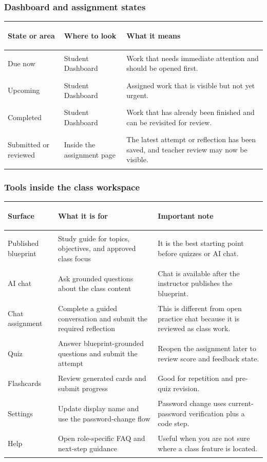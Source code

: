 \documentclass[11pt,a4paper]{article}
\begin{document}
\subsubsection*{Dashboard and assignment states}

\begin{table}[H]
\centering
\small
\begin{tabularx}{\textwidth}{>{\bfseries\raggedright\arraybackslash}p{2.8cm}>{\raggedright\arraybackslash}p{3.9cm}X}
\toprule
State or area & Where to look & What it means \\
\midrule
Due now & Student Dashboard & Work that needs immediate attention and should be opened first. \\
Upcoming & Student Dashboard & Assigned work that is visible but not yet urgent. \\
Completed & Student Dashboard & Work that has already been finished and can be revisited for review. \\
Submitted or reviewed & Inside the assignment page & The latest attempt or reflection has been saved, and teacher review may now be visible. \\
\bottomrule
\end{tabularx}
\end{table}

\subsubsection*{Tools inside the class workspace}

\begin{table}[H]
\centering
\small
\begin{tabularx}{\textwidth}{>{\bfseries\raggedright\arraybackslash}p{2.7cm}X>{\raggedright\arraybackslash}p{3.3cm}}
\toprule
Surface & What it is for & Important note \\
\midrule
Published blueprint & Study guide for topics, objectives, and approved class focus & It is the best starting point before quizzes or AI chat. \\
AI chat & Ask grounded questions about the class content & Chat is available after the instructor publishes the blueprint. \\
Chat assignment & Complete a guided conversation and submit the required reflection & This is different from open practice chat because it is reviewed as class work. \\
Quiz & Answer blueprint-grounded questions and submit the attempt & Reopen the assignment later to review score and feedback state. \\
Flashcards & Review generated cards and submit progress & Good for repetition and pre-quiz revision. \\
Settings & Update display name and use the password-change flow & Password change uses current-password verification plus a code step. \\
Help & Open role-specific FAQ and next-step guidance & Useful when you are not sure where a class feature is located. \\
\bottomrule
\end{tabularx}
\end{table}
\end{document}

